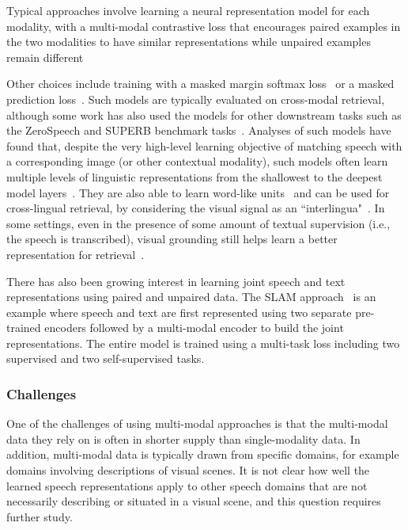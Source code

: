 Typical approaches involve learning a neural representation model for each modality, with a multi-modal contrastive loss that encourages paired examples in the two modalities to have similar representations while unpaired examples remain different~\cite{synnaeve_learning_2014,harwath_unsupervised_2016,harwath_deep_2015,merkx_language_2019,rouditchenko_avlnet_2021,peng_fastslow_2022}

Other choices include training with a masked margin softmax loss~\cite{ilharco_largescale_2019,sanabria_talk_2021} or a masked prediction loss~\cite{chan_multimodal_2022}.  Such models are typically evaluated on cross-modal retrieval, although some work has also used the models for other downstream tasks such as the ZeroSpeech and SUPERB benchmark tasks~\cite{peng_selfsupervised_2022}. 
Analyses of such models have found that, despite the very high-level learning objective of matching speech with a corresponding image (or other contextual modality), such models often learn multiple levels of linguistic representations from the shallowest to the deepest model layers~\cite{harwath_learning_2019,chrupala_representations_2017,scharenborg_linguistic_2018}.  They are also able to learn word-like units~\cite{harwath_jointly_2018,peng_word_2022,wang_dnnhmmdnn_2020} and can be used for cross-lingual retrieval, by considering the visual signal as an ``interlingua"~\cite{harwath_vision_2018,havard_models_2019,kamper_visually_2018}. 
In some settings, even in the presence of some amount of textual supervision (i.e., the speech is transcribed), visual grounding still helps learn a better representation for retrieval~\cite{pasad_contributions_2019}. 

There has also been growing interest in learning joint speech and text representations using paired and unpaired data. The SLAM approach~\cite{bapna_slam_2021} is an example where speech and text are first represented using two separate pre-trained encoders followed by a multi-modal encoder to build the joint representations. The entire model is trained using a multi-task loss including two supervised and two self-supervised tasks. 

\subsubsection{Challenges}
One of the challenges of using multi-modal approaches is that the multi-modal data they rely on is often in shorter supply than single-modality data. In addition, multi-modal data is typically drawn from specific domains, for example domains involving descriptions of visual scenes. It is not clear how well the learned speech representations apply to other speech domains that are not necessarily describing or situated in a visual scene, and this question requires further study.

